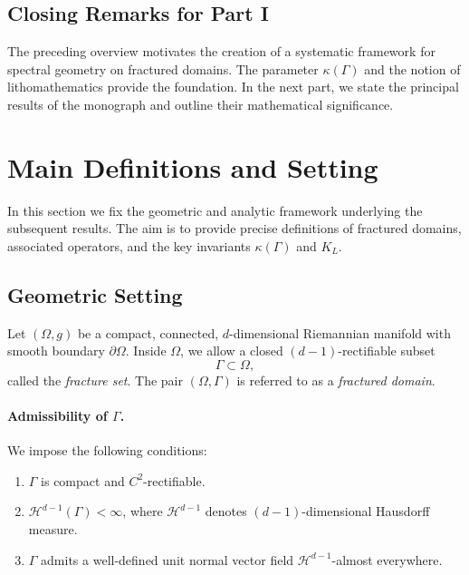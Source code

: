 \subsection{Closing Remarks for Part I}

The preceding overview motivates the creation of a systematic framework for 
spectral geometry on fractured domains. The parameter $\kappa(\Gamma)$ and 
the notion of lithomathematics provide the foundation. 
In the next part, we state the principal results of the monograph 
and outline their mathematical significance.


\section{Main Definitions and Setting}

In this section we fix the geometric and analytic framework underlying the
subsequent results. The aim is to provide precise definitions of fractured
domains, associated operators, and the key invariants
$\kappa(\Gamma)$ and $K_L$.

\subsection{Geometric Setting}

Let $(\Omega,g)$ be a compact, connected, $d$-dimensional Riemannian manifold
with smooth boundary $\partial\Omega$. Inside $\Omega$, we allow a closed
$(d-1)$-rectifiable subset
\[
\Gamma \subset \Omega,
\]
called the \emph{fracture set}. The pair $(\Omega,\Gamma)$ is referred to as a
\emph{fractured domain}.

\paragraph{Admissibility of $\Gamma$.}
We impose the following conditions:
\begin{enumerate}[label=(H\arabic*)]
  \item $\Gamma$ is compact and $C^2$-rectifiable.
  \item $\mathcal{H}^{d-1}(\Gamma) < \infty$, where
  $\mathcal{H}^{d-1}$ denotes $(d-1)$-dimensional Hausdorff measure.
  \item $\Gamma$ admits a well-defined unit normal vector field
  $\mathcal{H}^{d-1}$-almost everywhere.
\end{enumerate}

